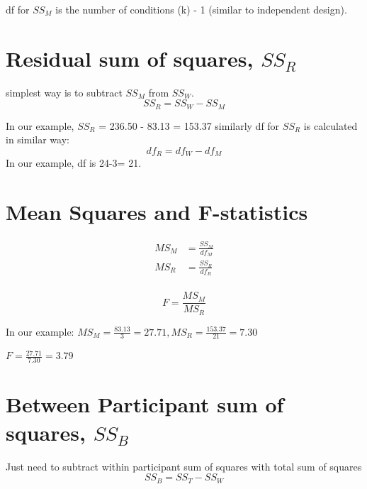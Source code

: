 df for $SS_M$ is the number of conditions (k) - 1 (similar to independent design).

\section{Residual sum of squares, $SS_R$}

simplest way is to subtract $SS_M$ from $SS_W$. 
\begin{equation}
SS_R = SS_W - SS_M
\end{equation}

In our example, $SS_R$ = 236.50 - 83.13 = 153.37
similarly df for $SS_R$ is calculated in similar way:
\begin{equation}
df_R = df_W - df_M
\end{equation}
In our example, df is 24-3= 21. 

\section{Mean Squares and F-statistics}

\begin{equation}
\begin{split}
MS_M & = \frac{SS_M}{df_M} \\
MS_R & = \frac{SS_R}{df_R} \\
\end{split}
\end{equation}

\begin{equation}
F = \frac{MS_M}{MS_R}
\end{equation}

In our example: $MS_M = \frac{83.13}{3} = 27.71, MS_R = \frac{153.37}{21} = 7.30$

$F = \frac{27.71}{7.30} = 3.79$

\section{Between Participant sum of squares, $SS_B$}
Just need to subtract within participant sum of squares with total sum of squares
\begin{equation}
SS_B = SS_T - SS_W
\end{equation}